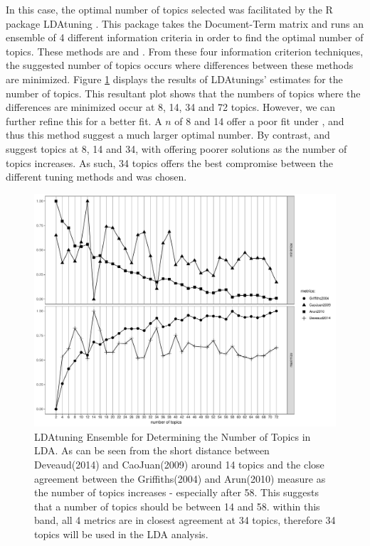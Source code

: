 In this case, the optimal number of topics selected was facilitated by the R package LDAtuning \citep{LDAtuning}. This package takes the Document-Term matrix and runs an ensemble of 4 different information criteria in order to find the optimal number of topics.  These methods are \cite{Arun2010} \cite{CAO2009} \cite{Griffiths2004} and \cite{deveaud2014}.  From these four information criterion techniques, the suggested number of topics occurs where differences between these methods are minimized. Figure \ref{fig:topicselection} displays the results of LDAtunings' estimates for the number of topics.  This resultant plot shows that the numbers of topics where the differences are minimized occur at 8, 14, 34 and 72 topics.  However, we can further refine this for a better fit.  A $n$ of 8 and 14 offer a poor fit under \cite{Griffiths2004}, and thus this method suggest a much larger optimal number.  By contrast, \cite{CAO2009} and \cite{deveaud2014} suggest topics at 8, 14 and 34, with \cite{deveaud2014} offering poorer solutions as the number of topics increases.  As such, 34 topics offers the best compromise between the different tuning methods and was chosen. 

\begin{figure}
	\centering
	\includegraphics[width=1\linewidth]{Figures/ChapterV/TopicSelection}
	\caption[LDAtuning Ensemble for Determining the Number of Topics in LDA]{LDAtuning Ensemble for Determining the Number of Topics in LDA.   As can be seen from the short distance between Deveaud(2014) and CaoJuan(2009) around 14 topics and the close agreement between the Griffiths(2004) and Arun(2010) measure as the number of topics increases - especially after 58.  This suggests that a number of topics should be between 14 and 58.  within  this band, all 4 metrics are in closest agreement at 34 topics, therefore 34 topics will be used in the LDA analysis.    }
	\label{fig:topicselection}
\end{figure}


